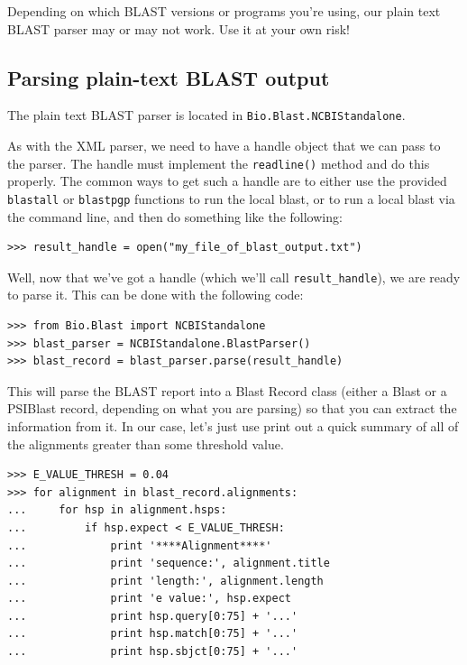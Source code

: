 \documentclass{report}
\begin{document}
Depending on which BLAST versions or programs you're using, our plain text BLAST parser may or may not work. Use it at your own risk!

\subsection{Parsing plain-text BLAST output}

The plain text BLAST parser is located in \verb|Bio.Blast.NCBIStandalone|.

As with the XML parser, we need to have a handle object that we can pass to the parser. The handle must implement the \verb|readline()| method and do this properly. The common ways to get such a handle are to either use the provided \verb|blastall| or \verb|blastpgp| functions to run the local blast, or to run a local blast via the command line, and then do something like the following:

\begin{verbatim}
>>> result_handle = open("my_file_of_blast_output.txt")
\end{verbatim}

Well, now that we've got a handle (which we'll call \verb|result_handle|),
we are ready to parse it. This can be done with the following code:

\begin{verbatim}
>>> from Bio.Blast import NCBIStandalone
>>> blast_parser = NCBIStandalone.BlastParser()
>>> blast_record = blast_parser.parse(result_handle)
\end{verbatim}

This will parse the BLAST report into a Blast Record class (either a Blast or a PSIBlast record, depending on what you are parsing) so that you can extract the information from it. In our case, let's just use print out a quick summary of all of the alignments greater than some threshold value.

\begin{verbatim}
>>> E_VALUE_THRESH = 0.04
>>> for alignment in blast_record.alignments:
...     for hsp in alignment.hsps:
...         if hsp.expect < E_VALUE_THRESH:
...             print '****Alignment****'
...             print 'sequence:', alignment.title
...             print 'length:', alignment.length
...             print 'e value:', hsp.expect
...             print hsp.query[0:75] + '...'
...             print hsp.match[0:75] + '...'
...             print hsp.sbjct[0:75] + '...'
\end{verbatim}
\end{document}
